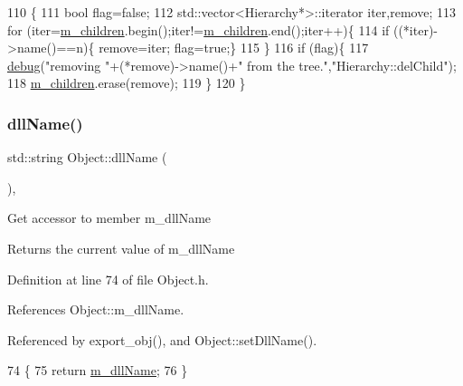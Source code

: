 \begin{DoxyCode}
110                                    \{
111   \textcolor{keywordtype}{bool} flag=\textcolor{keyword}{false};
112   std::vector<Hierarchy*>::iterator iter,\textcolor{keyword}{remove};
113   \textcolor{keywordflow}{for} (iter=\hyperlink{classHierarchy_a038816763941fd4a930504917f60483b}{m\_children}.begin();iter!=\hyperlink{classHierarchy_a038816763941fd4a930504917f60483b}{m\_children}.end();iter++)\{
114     \textcolor{keywordflow}{if} ((*iter)->name()==n)\{ \textcolor{keyword}{remove}=iter; flag=\textcolor{keyword}{true};\}
115   \}
116   \textcolor{keywordflow}{if} (flag)\{
117     \hyperlink{classObject_aac010553f022165573714b7014a15f0d}{debug}(\textcolor{stringliteral}{"removing "}+(*remove)->name()+\textcolor{stringliteral}{" from the tree."},\textcolor{stringliteral}{"Hierarchy::delChild"});
118     \hyperlink{classHierarchy_a038816763941fd4a930504917f60483b}{m\_children}.erase(\textcolor{keyword}{remove});
119   \}
120 \}
\end{DoxyCode}
\mbox{\label{classObject_a2e3947f2870094c332d7454117f3ec63}} 
\subsubsection{\texorpdfstring{dll\+Name()}{dllName()}}
{\footnotesize\ttfamily std\+::string Object\+::dll\+Name (\begin{DoxyParamCaption}{ }\end{DoxyParamCaption})\hspace{0.3cm}{\ttfamily [inline]}, {\ttfamily [inherited]}}

Get accessor to member m\+\_\+dll\+Name \begin{DoxyReturn}{Returns}
the current value of m\+\_\+dll\+Name 
\end{DoxyReturn}


Definition at line 74 of file Object.\+h.



References Object\+::m\+\_\+dll\+Name.



Referenced by export\+\_\+obj(), and Object\+::set\+Dll\+Name().


\begin{DoxyCode}
74                        \{
75     \textcolor{keywordflow}{return} \hyperlink{classObject_a01afbeacebb8db6831559972ec362eb3}{m\_dllName};
76   \}  
\end{DoxyCode}
\mbox{\label{classObject_a204a95f57818c0f811933917a30eff45}} 
